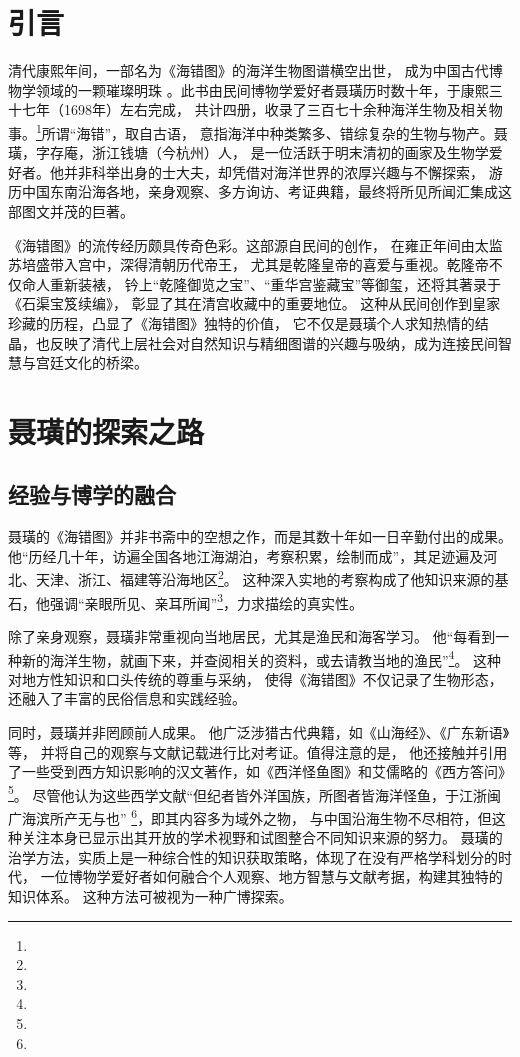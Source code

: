 \documentclass{source/Paper}
\begin{document}
\makeheader
\section{引言}
清代康熙年间，一部名为《海错图》的海洋生物图谱横空出世，
成为中国古代博物学领域的一颗璀璨明珠
。此书由民间博物学爱好者聂璜历时数十年，于康熙三十七年（1698年）左右完成，
共计四册，收录了三百七十余种海洋生物及相关物事。\footnote{}所谓“海错”，取自古语，
意指海洋中种类繁多、错综复杂的生物与物产。聂璜，字存庵，浙江钱塘（今杭州）人，
是一位活跃于明末清初的画家及生物学爱好者。他并非科举出身的士大夫，却凭借对海洋世界的浓厚兴趣与不懈探索，
游历中国东南沿海各地，亲身观察、多方询访、考证典籍，最终将所见所闻汇集成这部图文并茂的巨著。

《海错图》的流传经历颇具传奇色彩。这部源自民间的创作，
在雍正年间由太监苏培盛带入宫中，深得清朝历代帝王，
尤其是乾隆皇帝的喜爱与重视。乾隆帝不仅命人重新装裱，
钤上“乾隆御览之宝”、“重华宫鉴藏宝”等御玺，还将其著录于《石渠宝笈续编》，
彰显了其在清宫收藏中的重要地位。
这种从民间创作到皇家珍藏的历程，凸显了《海错图》独特的价值，
它不仅是聂璜个人求知热情的结晶，也反映了清代上层社会对自然知识与精细图谱的兴趣与吸纳，成为连接民间智慧与宫廷文化的桥梁。

\section{聂璜的探索之路}
\subsection{经验与博学的融合}
聂璜的《海错图》并非书斋中的空想之作，而是其数十年如一日辛勤付出的成果。
他“历经几十年，访遍全国各地江海湖泊，考察积累，绘制而成”，其足迹遍及河北、天津、浙江、福建等沿海地区\footnote{}。
这种深入实地的考察构成了他知识来源的基石，他强调“亲眼所见、亲耳所闻”\footnote{}，力求描绘的真实性。

除了亲身观察，聂璜非常重视向当地居民，尤其是渔民和海客学习。
他“每看到一种新的海洋生物，就画下来，并查阅相关的资料，或去请教当地的渔民”\footnote{}。
这种对地方性知识和口头传统的尊重与采纳，
使得《海错图》不仅记录了生物形态，还融入了丰富的民俗信息和实践经验。

同时，聂璜并非罔顾前人成果。
他广泛涉猎古代典籍，如《山海经》、《广东新语》等，
并将自己的观察与文献记载进行比对考证。值得注意的是，
他还接触并引用了一些受到西方知识影响的汉文著作，如《西洋怪鱼图》和艾儒略的《西方答问》\footnote{}。
尽管他认为这些西学文献“但纪者皆外洋国族，所图者皆海洋怪鱼，于江浙闽广海滨所产无与也” \footnote{}，即其内容多为域外之物，
与中国沿海生物不尽相符，但这种关注本身已显示出其开放的学术视野和试图整合不同知识来源的努力。
聂璜的治学方法，实质上是一种综合性的知识获取策略，体现了在没有严格学科划分的时代，
一位博物学爱好者如何融合个人观察、地方智慧与文献考据，构建其独特的知识体系。
这种方法可被视为一种广博探索。
\end{document}
